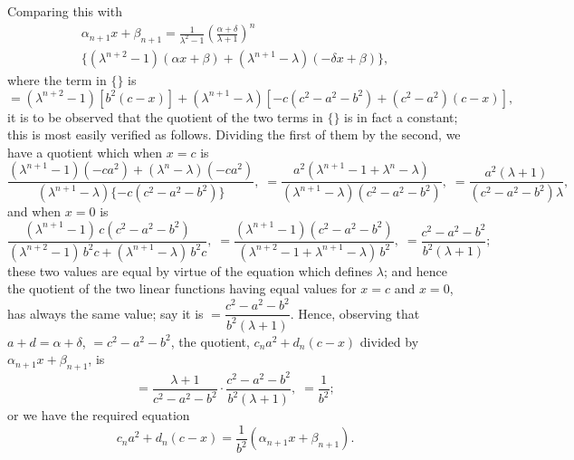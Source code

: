 \documentclass[12pt,a4paper,oneside]{book}
\theoremstyle{plain}
\theoremstyle{definition}
\theoremstyle{remark}
\begin{document}
Comparing this with
\begin{multline*}
\alpha_{n+1} x + \beta_{n+1} = \frac{1}{\lambda^2-1}\left(\frac{\alpha+\delta}{\lambda+1}\right)^n\\
\{ (\lambda^{n+2}-1)(\alpha x+\beta) + (\lambda^{n+1}-\lambda)(-\delta x+\beta) \},
\end{multline*}
where the term in $\{\}$ is
\[
= (\lambda^{n+2}-1)[b^2(c-x)] + (\lambda^{n+1}-\lambda)[-c(c^2-a^2-b^2) + (c^2-a^2)(c-x)],
\]
it is to be observed that the quotient of the two terms in $\{\}$ is in fact a constant; this is most easily verified as follows. Dividing the first of them by the second, we have a quotient which when $x=c$ is
\[
\frac{(\lambda^{n+1}-1)(-ca^2) + (\lambda^n-\lambda)(-ca^2)}
     {(\lambda^{n+1}-\lambda)\{-c(c^2-a^2-b^2)\}},\;
= \frac{a^2(\lambda^{n+1}-1+\lambda^n-\lambda)}
       {(\lambda^{n+1}-\lambda)(c^2-a^2-b^2)},\;
= \frac{a^2(\lambda+1)}{(c^2-a^2-b^2)\lambda},
\]
and when $x=0$ is
\[
\frac{(\lambda^{n+1}-1)\,c(c^2-a^2-b^2)}
     {(\lambda^{n+2}-1)\,b^2 c + (\lambda^{n+1}-\lambda)\,b^2 c},\;
= \frac{(\lambda^{n+1}-1)(c^2-a^2-b^2)}
       {(\lambda^{n+2}-1+\lambda^{n+1}-\lambda)\,b^2},\;
= \frac{c^2-a^2-b^2}{b^2(\lambda+1)};
\]
these two values are equal by virtue of the equation which defines $\lambda$; and hence the quotient of the two linear functions having equal values for $x=c$ and $x=0$, has always the same value; say it is $= \dfrac{c^2-a^2-b^2}{b^2(\lambda+1)}$. Hence, observing that $a+d = \alpha+\delta$, $= c^2-a^2-b^2$, the quotient, $c_n a^2 + d_n(c-x)$ divided by $\alpha_{n+1} x + \beta_{n+1}$, is
\[
= \frac{\lambda+1}{c^2-a^2-b^2} \cdot \frac{c^2-a^2-b^2}{b^2(\lambda+1)},\; = \frac{1}{b^2};
\]
or we have the required equation
\[
c_n a^2 + d_n(c-x) = \frac{1}{b^2}(\alpha_{n+1} x + \beta_{n+1}).
\]
\end{document}
